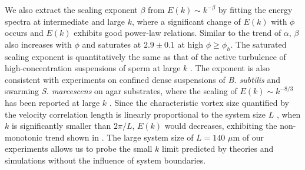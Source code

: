 \documentclass[twocolumn,aps,prl,amsmath,amssymb,longbibliography]{revtex4-2}
\begin{document}
We also extract the scaling exponent $\beta$ from $E(k) \sim k^{-\beta}$ by fitting the energy spectra at intermediate and large $k$, where a significant change of $E(k)$ with $\phi$ occurs and $E(k)$ exhibits good power-law relations.
Similar to the trend of $\alpha$, $\beta$ also increases with $\phi$ and saturates at $2.9 \pm 0.1$ at high $\phi \geq \phi_h$. The saturated scaling exponent is quantitatively the same as that of the active turbulence of high-concentration suspensions of sperm at large $k$ \cite{Creppy2015}. The exponent is also consistent with experiments on confined dense suspensions of \textit{B. subtilis} and swarming \textit{S. marcescens} on agar substrates, where the scaling of $E(k) \sim k^{-8/3}$ has been reported at large $k$ \cite{Wensink2012,Patteson2018}. Since the characteristic vortex size quantified by the velocity correlation length is linearly proportional to the system size $L$ \cite{Guo2018}, when $k$ is significantly smaller than $2\pi/L$, $E(k)$ would decreases, exhibiting the non-monotonic trend shown in \cite{Wensink2012,Patteson2018}. The large system size of $L = 140$ $\mu$m of our experiments allows us to probe the small $k$ limit predicted by theories and simulations without the influence of system boundaries.
\end{document}
